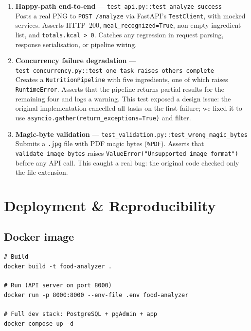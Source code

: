 \documentclass[11pt,a4paper]{article}
\begin{document}
\begin{enumerate}[topsep=4pt,itemsep=4pt]
  \item \textbf{Happy-path end-to-end} --- \texttt{test\_api.py::test\_analyze\_success}\\
    Posts a real PNG to \texttt{POST /analyze} via FastAPI's \texttt{TestClient}, with mocked services.
    Asserts HTTP~200, \texttt{meal\_recognized=True}, non-empty ingredient list, and \texttt{totals.kcal > 0}.
    Catches any regression in request parsing, response serialisation, or pipeline wiring.

  \item \textbf{Concurrency failure degradation} --- \texttt{test\_concurrency.py::test\_one\_task\_raises\_others\_complete}\\
    Creates a \texttt{NutritionPipeline} with five ingredients, one of which raises \texttt{RuntimeError}.
    Asserts that the pipeline returns partial results for the remaining four and logs a warning.
    This test exposed a design issue: the original implementation cancelled all tasks on the first failure;
    we fixed it to use \texttt{asyncio.gather(return\_exceptions=True)} and filter.

  \item \textbf{Magic-byte validation} --- \texttt{test\_validation.py::test\_wrong\_magic\_bytes}\\
    Submits a \texttt{.jpg} file with PDF magic bytes (\texttt{\%PDF}).
    Asserts that \texttt{validate\_image\_bytes} raises \texttt{ValueError("Unsupported image format")} before any API call.
    This caught a real bug: the original code checked only the file extension.
\end{enumerate}

\section{Deployment \& Reproducibility}\label{sec:deploy}

\subsection{Docker image}

\begin{lstlisting}[style=bash]
# Build
docker build -t food-analyzer .

# Run (API server on port 8000)
docker run -p 8000:8000 --env-file .env food-analyzer

# Full dev stack: PostgreSQL + pgAdmin + app
docker compose up -d
\end{lstlisting}
\end{document}
